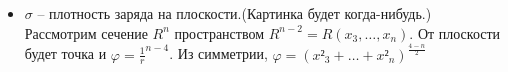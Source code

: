 \begin{solution}
\begin{itemize}
\begin{enumerate}
      Получаем, полное выражение потенциала
      \begin{equation*}
        φ =
        \begin{aligned}
          \bcase{
            \frac{n}{2(n-2)}R^2V¹_nρ_0 -V¹_nρ_0\frac{r^2}{2}&,r≤R\\
            \frac{ρ_0V^R_n}{(n-2)r^{n-2}}&,r>R
          }
        \end{aligned}
      \end{equation*}
    \end{enumerate}
  \item $σ$ -- плотность заряда на плоскости.(Картинка будет
    когда-нибудь.) Рассмотрим сечение $R^n$ пространством
    $R^{n-2}=R(x_3,…,x_n)$. От плоскости будет точка и $φ=\frac
    1r^{n-4}$. Из  симметрии, $φ = (x²_3+…+x²_n)^{\frac{4-n}2}$
  \end{itemize}
\end{solution}
